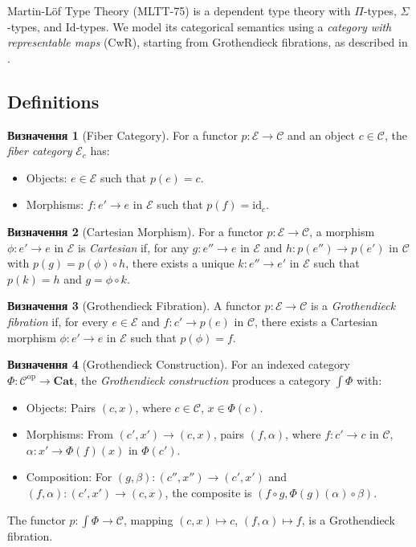 \documentclass{article}
\theoremstyle{definition}
\newtheorem{definition}{Визначення}[section]
\begin{document}
Martin-Löf Type Theory (MLTT-75) is a dependent type theory with $\Pi$-types,
$\Sigma$-types, and Id-types. We model its categorical semantics using
a \emph{category with representable maps} (CwR), starting from Grothendieck
fibrations, as described in \cite{uemura}.

\subsection{Definitions}
\begin{definition}[Fiber Category]
For a functor \(p : \mathcal{E} \to \mathcal{C}\) and an object \(c \in \mathcal{C}\), the \emph{fiber category} \(\mathcal{E}_c\) has:
\begin{itemize}
    \item Objects: \(e \in \mathcal{E}\) such that \(p(e) = c\).
    \item Morphisms: \(f : e' \to e\) in \(\mathcal{E}\) such that \(p(f) = \mathrm{id}_c\).
\end{itemize}
\end{definition}

\begin{definition}[Cartesian Morphism]
For a functor \(p : \mathcal{E} \to \mathcal{C}\), a morphism \(\phi : e' \to e\) in \(\mathcal{E}\) is \emph{Cartesian} if, for any \(g : e'' \to e\) in \(\mathcal{E}\) and \(h : p(e'') \to p(e')\) in \(\mathcal{C}\) with \(p(g) = p(\phi) \circ h\), there exists a unique \(k : e'' \to e'\) in \(\mathcal{E}\) such that \(p(k) = h\) and \(g = \phi \circ k\).
\end{definition}

\begin{definition}[Grothendieck Fibration]
A functor \(p : \mathcal{E} \to \mathcal{C}\) is a \emph{Grothendieck fibration} if, for every \(e \in \mathcal{E}\) and \(f : c' \to p(e)\) in \(\mathcal{C}\), there exists a Cartesian morphism \(\phi : e' \to e\) in \(\mathcal{E}\) such that \(p(\phi) = f\).
\end{definition}

\begin{definition}[Grothendieck Construction]
For an indexed category \(\Phi : \mathcal{C}^{\mathrm{op}} \to \mathbf{Cat}\), the \emph{Grothendieck construction} produces a category \(\int \Phi\) with:
\begin{itemize}
    \item Objects: Pairs \((c, x)\), where \(c \in \mathcal{C}\), \(x \in \Phi(c)\).
    \item Morphisms: From \((c', x') \to (c, x)\), pairs \((f, \alpha)\), where \(f : c' \to c\) in \(\mathcal{C}\), \(\alpha : x' \to \Phi(f)(x)\) in \(\Phi(c')\).
    \item Composition: For \((g, \beta) : (c'', x'') \to (c', x')\) and \((f, \alpha) : (c', x') \to (c, x)\), the composite is \((f \circ g, \Phi(g)(\alpha) \circ \beta)\).
\end{itemize}
The functor \(p : \int \Phi \to \mathcal{C}\), mapping \((c, x) \mapsto c\), \((f, \alpha) \mapsto f\), is a Grothendieck fibration.
\end{definition}
\end{document}
